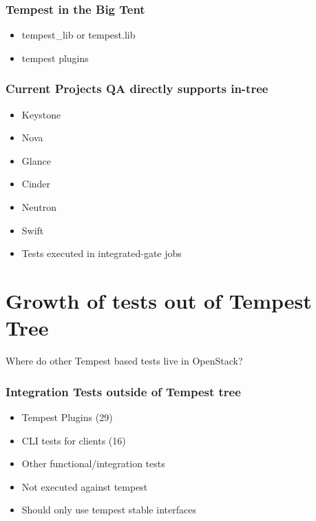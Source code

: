 \documentclass[aspectratio=169,11pt,hyperref={colorlinks=true}]{beamer}
\begin{document}
\begin{frame}[c]
    \frametitle{Tempest in the Big Tent}
    \begin{itemize}
        \item tempest\_lib or tempest.lib
        \item tempest plugins
    \end{itemize}
\end{frame}

\begin{frame}
    \frametitle{Current Projects QA directly supports in-tree}
    \begin{itemize}
        \item Keystone
        \item Nova
        \item Glance
        \item Cinder
        \item Neutron
        \item Swift
    \end{itemize}
    \begin{itemize}
        \item{Tests executed in integrated-gate jobs}
    \end{itemize}
\end{frame}

\section{Growth of tests out of Tempest Tree}
\begin{frame}[c]
    \begin{center}
        \large Where do other Tempest based tests live in OpenStack?
    \end{center}
\end{frame}

\begin{frame}
    \frametitle{Integration Tests outside of Tempest tree}
    \begin{itemize}
        \item{Tempest Plugins (29)}
        \item{CLI tests for clients (16)}
        \item{Other functional/integration tests}
    \end{itemize}
    \text{ }
    \begin{itemize}
        \item{Not executed against tempest}
        \item{Should only use tempest stable interfaces}
    \end{itemize}
\end{frame}
\end{document}
